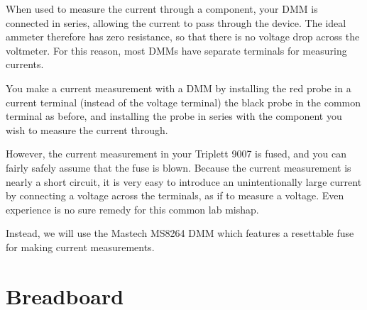 When used to measure the current through a component, your DMM is
connected in series, allowing the current to pass through the device.
The ideal ammeter therefore has zero resistance, so that there is no
voltage drop across the voltmeter.  For this reason, most DMMs have
separate terminals for measuring currents. 

You make a current measurement with a DMM by installing the red probe
in a current terminal (instead of the voltage terminal) the black
probe in the common terminal as before, and installing the probe in
series with the component you wish to measure the current through.

However, the current measurement in your Triplett 9007 is fused, and
you can fairly safely assume that the fuse is blown.  Because the
current measurement is nearly a short circuit, it is very easy to
introduce an unintentionally large current by connecting a voltage
across the terminals, as if to measure a voltage.  Even experience is no
sure remedy for this common lab mishap.

Instead, we will use the Mastech MS8264 DMM which features a resettable
fuse for making current measurements.

\section{Breadboard}

